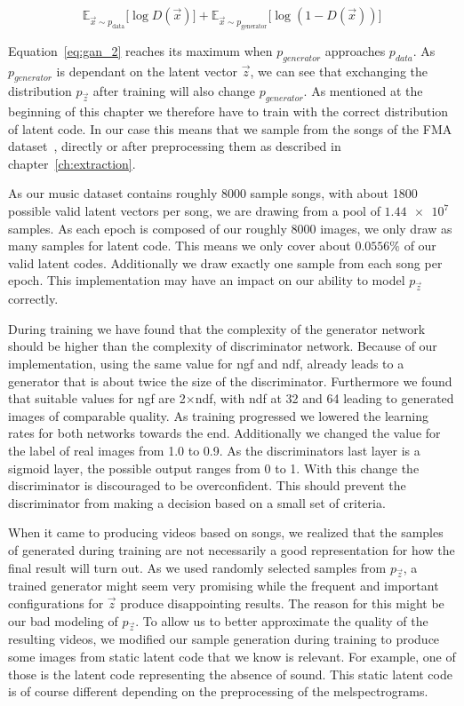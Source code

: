             \begin{equation}
                \mathbb{E}_{\vec{x} \sim p_{\text{data}}}
                    \bigl[ \log D(\vec{x}) \bigr] +
                \mathbb{E}_{\vec{x} \sim p_{\text{generator}}}
                    \bigl[ \log \left( 1 - D(\vec{x}) \right) \bigr]
                \label{eq:gan_2}
            \end{equation}

            Equation~\ref{eq:gan_2} reaches its maximum when $p_{generator}$ approaches $p_{data}$. As $p_{generator}$ is dependant on the latent vector $\vec{z}$, we can see that exchanging the distribution $p_{\vec{z}}$ after training will also change $p_{generator}$. As mentioned at the beginning of this chapter we therefore have to train with the correct distribution of latent code. In our case this means that we sample from the songs of the FMA dataset~\cite{FMA}, directly or after preprocessing them as described in chapter~\ref{ch:extraction}.

            As our music dataset contains roughly 8000 sample songs, with about 1800 possible valid latent vectors per song, we are drawing from a pool of $\num{1.44e7}$ samples. As each epoch is composed of our roughly 8000 images, we only draw as many samples for latent code. This means we only cover about $0.0556\%$ of our valid latent codes. Additionally we draw exactly one sample from each song per epoch. This implementation may have an impact on our ability to model $p_{\vec{z}}$ correctly.

            During training we have found that the complexity of the generator network should be higher than the complexity of discriminator network. Because of our implementation, using the same value for ngf and ndf, already leads to a generator that is about twice the size of the discriminator. Furthermore we found that suitable values for ngf are 2$\times$ndf, with ndf at 32 and 64 leading to generated images of comparable quality. As training progressed we lowered the learning rates for both networks towards the end. Additionally we changed the value for the label of real images from 1.0 to 0.9. As the discriminators last layer is a sigmoid layer, the possible output ranges from 0 to 1. With this change the discriminator is discouraged to be overconfident. This should prevent the discriminator from making a decision based on a small set of criteria.

            When it came to producing videos based on songs, we realized that the samples of generated during training are not necessarily a good representation for how the final result will turn out. As we used randomly selected samples from $p_{\vec{z}}$, a trained generator might seem very promising while the frequent and important configurations for $\vec{z}$ produce disappointing results. The reason for this might be our bad modeling of $p_{\vec{z}}$. To allow us to better approximate the quality of the resulting videos, we modified our sample generation during training to produce some images from static latent code that we know is relevant. For example, one of those is the latent code representing the absence of sound. This static latent code is of course different depending on the preprocessing of the melspectrograms.

